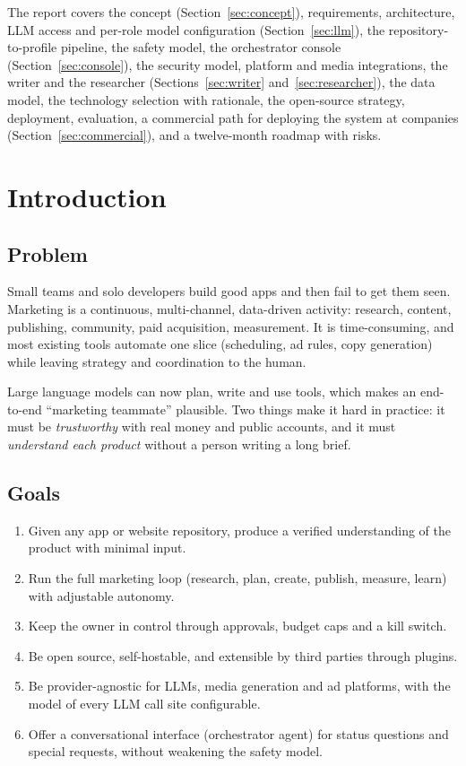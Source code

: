 \documentclass[11pt,a4paper]{article}
\begin{document}
The report covers the concept (Section~\ref{sec:concept}), requirements, architecture, LLM access and per-role model configuration (Section~\ref{sec:llm}), the repository-to-profile pipeline, the safety model, the orchestrator console (Section~\ref{sec:console}), the security model, platform and media integrations, the writer and the researcher (Sections~\ref{sec:writer} and~\ref{sec:researcher}), the data model, the technology selection with rationale, the open-source strategy, deployment, evaluation, a commercial path for deploying the system at companies (Section~\ref{sec:commercial}), and a twelve-month roadmap with risks.

\clearpage
\section{Introduction}

\subsection{Problem}
Small teams and solo developers build good apps and then fail to get them seen. Marketing is a continuous, multi-channel, data-driven activity: research, content, publishing, community, paid acquisition, measurement. It is time-consuming, and most existing tools automate one slice (scheduling, ad rules, copy generation) while leaving strategy and coordination to the human.

Large language models can now plan, write and use tools, which makes an end-to-end ``marketing teammate'' plausible. Two things make it hard in practice: it must be \emph{trustworthy} with real money and public accounts, and it must \emph{understand each product} without a person writing a long brief.

\subsection{Goals}
\begin{enumerate}
  \item Given any app or website repository, produce a verified understanding of the product with minimal input.
  \item Run the full marketing loop (research, plan, create, publish, measure, learn) with adjustable autonomy.
  \item Keep the owner in control through approvals, budget caps and a kill switch.
  \item Be open source, self-hostable, and extensible by third parties through plugins.
  \item Be provider-agnostic for LLMs, media generation and ad platforms, with the model of every LLM call site configurable.
  \item Offer a conversational interface (orchestrator agent) for status questions and special requests, without weakening the safety model.
\end{enumerate}
\end{document}

